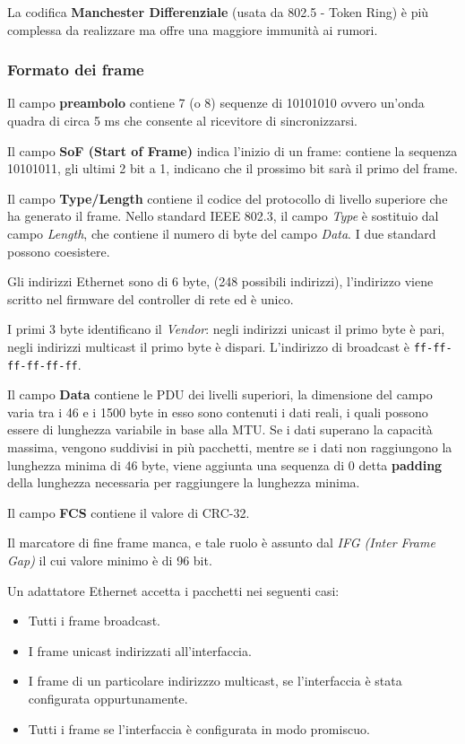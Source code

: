             La codifica \textbf{Manchester Differenziale} (usata da 802.5 - Token Ring) è più complessa da realizzare ma offre una maggiore immunità ai rumori.

        \subsubsection{Formato dei frame}
            

            Il campo \textbf{preambolo} contiene 7 (o 8) sequenze di 10101010 ovvero un'onda quadra di circa 5 ms che consente al ricevitore di sincronizzarsi.

            Il campo \textbf{SoF (Start of Frame)} indica l'inizio di un frame: contiene la sequenza 10101011, gli ultimi 2 bit a 1, indicano che il prossimo bit sarà il primo del frame.

            Il campo \textbf{Type/Length} contiene il codice del protocollo di livello superiore che ha generato il frame. Nello standard IEEE 802.3, il campo \textit{Type} è sostituio dal campo \textit{Length}, che contiene il numero di byte del campo \textit{Data}. I due standard possono coesistere.

            Gli indirizzi Ethernet sono di 6 byte, (248 possibili indirizzi), l'indirizzo viene scritto nel firmware del controller di rete ed è unico.

            I primi 3 byte identificano il \textit{Vendor}: negli indirizzi unicast il primo byte è pari, negli indirizzi multicast il primo byte è dispari. L'indirizzo di broadcast è \texttt{ff-ff-ff-ff-ff-ff}.

            Il campo \textbf{Data} contiene le PDU dei livelli superiori, la dimensione del campo varia tra i 46 e i 1500 byte in esso sono contenuti i dati reali, i quali possono essere di lunghezza variabile in base alla MTU. Se i dati superano la capacità massima, vengono suddivisi in più pacchetti, mentre se i dati non raggiungono la lunghezza minima di 46 byte, viene aggiunta una sequenza di 0 detta \textbf{padding} della lunghezza necessaria per raggiungere la lunghezza minima.

            Il campo \textbf{FCS} contiene il valore di CRC-32.

            Il marcatore di fine frame manca, e tale ruolo è assunto dal \textit{IFG (Inter Frame Gap)} il cui valore minimo è di 96 bit.

            Un adattatore Ethernet accetta i pacchetti nei seguenti casi:
            \begin{itemize}
                \item Tutti i frame broadcast.
                \item I frame unicast indirizzati all'interfaccia.
                \item I frame di un particolare indirizzzo multicast, se l'interfaccia è stata configurata oppurtunamente.
                \item Tutti i frame se l'interfaccia è configurata in modo promiscuo.
            \end{itemize}

